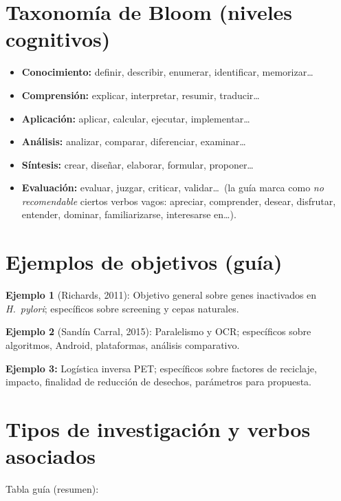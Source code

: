 \documentclass[a4paper,11pt]{book}
\begin{document}
\section{Taxonomía de Bloom (niveles cognitivos)}
\begin{itemize}[leftmargin=*]
  \item \textbf{Conocimiento:} definir, describir, enumerar, identificar, memorizar\ldots
  \item \textbf{Comprensión:} explicar, interpretar, resumir, traducir\ldots
  \item \textbf{Aplicación:} aplicar, calcular, ejecutar, implementar\ldots
  \item \textbf{Análisis:} analizar, comparar, diferenciar, examinar\ldots
  \item \textbf{Síntesis:} crear, diseñar, elaborar, formular, proponer\ldots
  \item \textbf{Evaluación:} evaluar, juzgar, criticar, validar\ldots\ (la guía marca como \textit{no recomendable} ciertos verbos vagos: apreciar, comprender, desear, disfrutar, entender, dominar, familiarizarse, interesarse en\ldots).
\end{itemize}

\section{Ejemplos de objetivos (guía)}
\textbf{Ejemplo 1} (Richards, 2011): Objetivo general sobre genes inactivados en \textit{H.\ pylori}; específicos sobre screening y cepas naturales.

\textbf{Ejemplo 2} (Sandín Carral, 2015): Paralelismo y OCR; específicos sobre algoritmos, Android, plataformas, análisis comparativo.

\textbf{Ejemplo 3:} Logística inversa PET; específicos sobre factores de reciclaje, impacto, finalidad de reducción de desechos, parámetros para propuesta.

\section{Tipos de investigación y verbos asociados}
Tabla guía (resumen):
\end{document}
